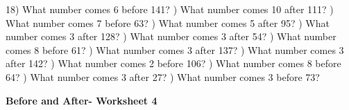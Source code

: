 \documentclass{article}%
\begin{document}
18) What number comes 6 before 141?%
\newline%
\newline%
) What number comes 10 after 111?%
\newline%
\newline%
) What number comes 7 before 63?%
\newline%
\newline%
) What number comes 5 after 95?%
\newline%
\newline%
) What number comes 3 after 128?%
\newline%
\newline%
) What number comes 3 after 54?%
\newline%
\newline%
) What number comes 8 before 61?%
\newline%
\newline%
) What number comes 3 after 137?%
\newline%
\newline%
) What number comes 3 after 142?%
\newline%
\newline%
) What number comes 2 before 106?%
\newline%
\newline%
) What number comes 8 before 64?%
\newline%
\newline%
) What number comes 3 after 27?%
\newline%
\newline%
) What number comes 3 before 73?%
\newline%
\newline%
\newline%
\pagebreak%
\large%
\begin{center}%
\textbf{Before and After- Worksheet 4}%
\newline%
\newline%
\newline%
\end{center} \normalsize%
\end{document}
